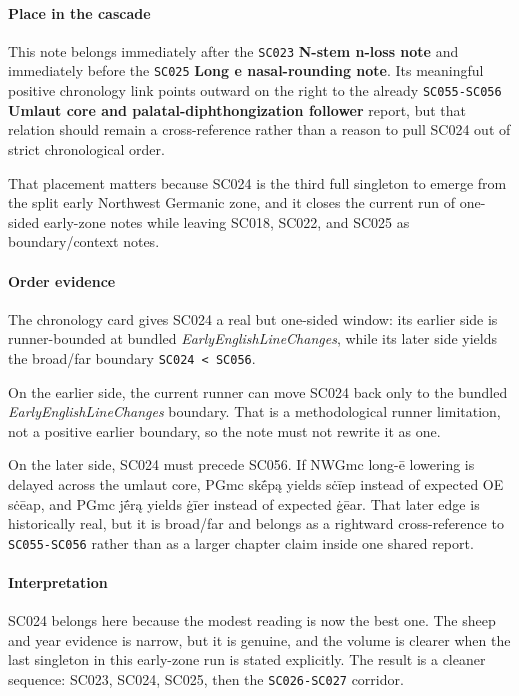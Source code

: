 \documentclass[
  british,
  a4paper,
]{article}
\begin{document}
\paragraph{Place in the cascade}\label{place-in-the-cascade-17}

This note belongs immediately after the \texttt{SC023} \textbf{N-stem
n-loss note} and immediately before the \texttt{SC025} \textbf{Long e
nasal-rounding note}. Its meaningful positive chronology link points
outward on the right to the already \texttt{SC055-SC056} \textbf{Umlaut
core and palatal-diphthongization follower} report, but that relation
should remain a cross-reference rather than a reason to pull SC024 out
of strict chronological order.

That placement matters because SC024 is the third full singleton to
emerge from the split early Northwest Germanic zone, and it closes the
current run of one-sided early-zone notes while leaving SC018, SC022,
and SC025 as boundary/context notes.

\paragraph{Order evidence}\label{order-evidence-17}

The chronology card gives SC024 a real but one-sided window: its earlier
side is runner-bounded at bundled \emph{EarlyEnglishLineChanges}, while
its later side yields the broad/far boundary
\texttt{SC024\ \textless{}\ SC056}.

On the earlier side, the current runner can move SC024 back only to the
bundled \emph{EarlyEnglishLineChanges} boundary. That is a
methodological runner limitation, not a positive earlier boundary, so
the note must not rewrite it as one.

On the later side, SC024 must precede SC056. If NWGmc long-ē lowering is
delayed across the umlaut core, PGmc skḗpą yields sċīep instead of
expected OE sċēap, and PGmc jḗrą yields ġīer instead of expected ġēar.
That later edge is historically real, but it is broad/far and belongs as
a rightward cross-reference to \texttt{SC055-SC056} rather than as a
larger chapter claim inside one shared report.

\paragraph{Interpretation}\label{interpretation-17}

SC024 belongs here because the modest reading is now the best one. The
sheep and year evidence is narrow, but it is genuine, and the volume is
clearer when the last singleton in this early-zone run is stated
explicitly. The result is a cleaner sequence: SC023, SC024, SC025, then
the \texttt{SC026-SC027} corridor.
\end{document}
